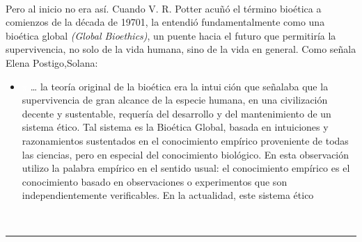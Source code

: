 \documentclass[12pt,letterpaper]{article}
\begin{document}
\pagestyle{fancy}
        \fancyhf{}
\begin{multicols}{2}
\\
\noindent Pero al inicio no era así. Cuando V. R. Potter acuñó el término bioética a comienzos de la década de 19701, la entendió fundamentalmente como una bioética global \textit{(Global Bioethics)}, un puente hacia el futuro que permitiría la supervivencia, no solo de la vida humana, sino de la vida en general. Como señala Elena Postigo,Solana: 
\\

  \begin {itemize}
    \item[\textcolor{white}{x}]… la teoría original de la bioética era la intuición que señalaba que la supervivencia de gran 
alcance de la especie humana, en una civilización decente y sustentable, requería del desarrollo y del mantenimiento de un sistema ético. Tal sistema es la Bioética Global, basada en intuiciones y razonamientos sustentados en el conocimiento empírico proveniente de todas las ciencias, pero en especial del conocimiento biológico. En esta observación utilizo la palabra empírico en el sentido usual: el conocimiento empírico es el conocimiento basado en observaciones o experimentos que son independientemente verificables. En la actualidad, este sistema ético 
  \end{itemize} 
\\

\noindent \rule{50mm}{0.1mm}


\end{multicols}
\end{document}
